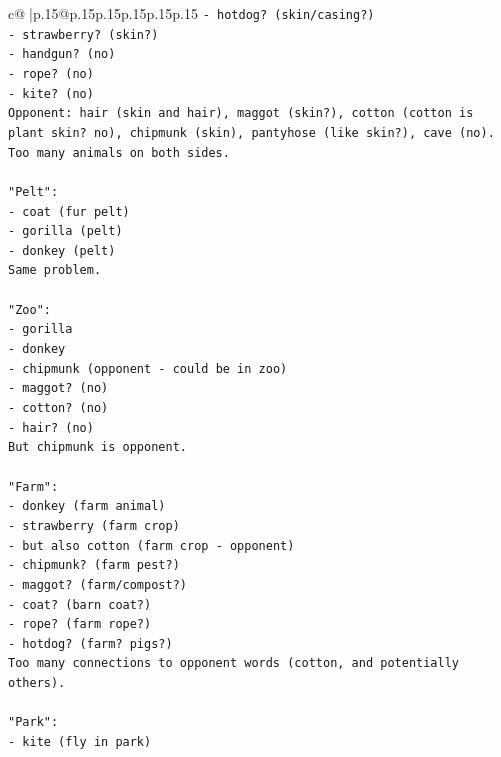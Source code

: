 \documentclass{article}
\begin{document}
{\begin{supertabular}{c@{$\;$}|p{.15\linewidth}@{}p{.15\linewidth}p{.15\linewidth}p{.15\linewidth}p{.15\linewidth}p{.15\linewidth}}
{{{\texttt{{-} hotdog? (skin/casing?)} \\
\texttt{{-} strawberry? (skin?)} \\
\texttt{{-} handgun? (no)} \\
\texttt{{-} rope? (no)} \\
\texttt{{-} kite? (no)} \\
\texttt{Opponent: hair (skin and hair), maggot (skin?), cotton (cotton is plant skin? no), chipmunk (skin), pantyhose (like skin?), cave (no).} \\
\texttt{Too many animals on both sides.} \\
\\ 
\texttt{"Pelt":} \\
\texttt{{-} coat (fur pelt)} \\
\texttt{{-} gorilla (pelt)} \\
\texttt{{-} donkey (pelt)} \\
\texttt{Same problem.} \\
\\ 
\texttt{"Zoo":} \\
\texttt{{-} gorilla} \\
\texttt{{-} donkey} \\
\texttt{{-} chipmunk (opponent {-} could be in zoo)} \\
\texttt{{-} maggot? (no)} \\
\texttt{{-} cotton? (no)} \\
\texttt{{-} hair? (no)} \\
\texttt{But chipmunk is opponent.} \\
\\ 
\texttt{"Farm":} \\
\texttt{{-} donkey (farm animal)} \\
\texttt{{-} strawberry (farm crop)} \\
\texttt{{-} but also cotton (farm crop {-} opponent)} \\
\texttt{{-} chipmunk? (farm pest?)} \\
\texttt{{-} maggot? (farm/compost?)} \\
\texttt{{-} coat? (barn coat?)} \\
\texttt{{-} rope? (farm rope?)} \\
\texttt{{-} hotdog? (farm? pigs?)} \\
\texttt{Too many connections to opponent words (cotton, and potentially others).} \\
\\ 
\texttt{"Park":} \\
\texttt{{-} kite (fly in park)} \\
}}}
\end{supertabular}}
\end{document}
